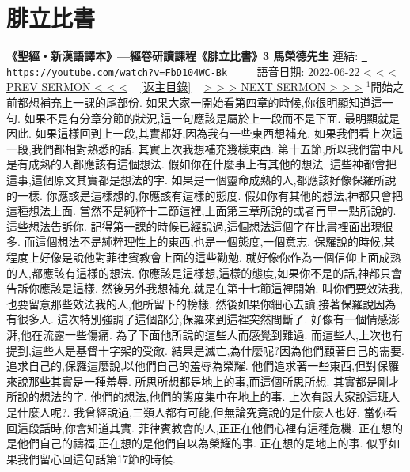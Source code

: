 \documentclass{book}
\begin{document}
\section{腓立比書}
\label{sec:FbD104WC_Bk}
\textbf{《聖經‧新漢語譯本》—經卷研讀課程《腓立比書》3 馬榮德先生}
\newline
\newline
連結: \href{https://youtube.com/watch?v=FbD104WC-Bk}{\texttt{ https://youtube.com/watch?v=FbD104WC-Bk}} ~~~~ 語音日期: 2022-06-22 
\newline
\newline
\hyperref[sec:fzMfZHATZ0U]{\small{< < < PREV SERMON < < <}}
~
\hyperref[sec:index]{\small{[返主目錄]}}
~
\hyperref[sec:ok3V257cOIA]{\small{> > > NEXT SERMON > > >}}
\newline
\newline
$^{1}$開始之前都想補充上一課的尾部份.
如果大家一開始看第四章的時候,你很明顯知道這一句.
如果不是有分章分節的狀況,這一句應該是屬於上一段而不是下面.
最明顯就是因此.
如果這樣回到上一段,其實都好,因為我有一些東西想補充.
如果我們看上次這一段,我們都相對熟悉的話.
其實上次我想補充幾樣東西.
第十五節,所以我們當中凡是有成熟的人都應該有這個想法.
假如你在什麼事上有其他的想法.
這些神都會把這事,這個原文其實都是想法的字.
如果是一個靈命成熟的人,都應該好像保羅所說的一樣.
你應該是這樣想的,你應該有這樣的態度.
假如你有其他的想法,神都只會把這種想法上面.
當然不是純粹十二節這裡,上面第三章所說的或者再早一點所說的.
這些想法告訴你.
記得第一課的時候已經說過,這個想法這個字在比書裡面出現很多.
而這個想法不是純粹理性上的東西,也是一個態度,一個意志.
保羅說的時候,某程度上好像是說他對菲律賓教會上面的這些勸勉.
就好像你作為一個信仰上面成熟的人,都應該有這樣的想法.
你應該是這樣想,這樣的態度,如果你不是的話,神都只會告訴你應該是這樣.
然後另外我想補充,就是在第十七節這裡開始.
叫你們要效法我,也要留意那些效法我的人,他所留下的榜樣.
然後如果你細心去讀,接著保羅說因為有很多人.
這次特別強調了這個部分,保羅來到這裡突然間斷了.
好像有一個情感澎湃,他在流露一些傷痛.
為了下面他所說的這些人而感覺到難過.
而這些人,上次也有提到,這些人是基督十字架的受敵.
結果是滅亡,為什麼呢?因為他們顧著自己的需要.
追求自己的,保羅這麼說,以他們自己的羞辱為榮耀.
他們追求著一些東西,但對保羅來說那些其實是一種羞辱.
所思所想都是地上的事,而這個所思所想.
其實都是剛才所說的想法的字.
他們的想法,他們的態度集中在地上的事.
上次有跟大家說這班人是什麼人呢?.
我曾經說過,三類人都有可能,但無論究竟說的是什麼人也好.
當你看回這段話時,你會知道其實.
菲律賓教會的人,正正在他們心裡有這種危機.
正在想的是他們自己的禱福,正在想的是他們自以為榮耀的事.
正在想的是地上的事.
似乎如果我們留心回這句話第17節的時候.
\end{document}
